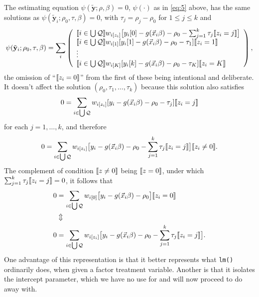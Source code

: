 \documentclass{article}
\DeclarePairedDelimiter{\indicator}{\llbracket}{\rrbracket}
\newcommand{\owt}[1][z_i]{\ensuremath{w_{i[#1]}}}
\begin{document}
The estimating equation $\psi(\tilde{\mathbf{y}}; \rho, \beta)=0$,
$\psi(\cdot)$ as in \eqref{eq:5} above, has the same solutions as $\psi(\tilde{\mathbf{y}}_{i};
  \rho_{0}, \tau, \beta)=0$, with $\tau_{j}=\rho_{j}-\rho_{0}$ for
$1\leq j \leq k$ and
\begin{equation*}
         \psi(\tilde{\mathbf{y}}_{i};
  \rho_{0}, \tau, \beta) =
         \sum_{i}\left( \begin{array}{l}
           \indicator{i \in \bigcup \mathcal{Q}}\owt{}\big[y_{i}[0] - g(\vec{x}_{i}\beta)-
                  \rho_{0} - \sum_{j=1}^{k}\tau_{j}\indicator{z_{i}=j}\big]\\
           \indicator{i \in \bigcup \mathcal{Q}}\owt[1][y_{i}[1] - g(\vec{x}_{i}\beta)-
                  \rho_{0}-\tau_{1}]\indicator{z_{i}=1}\\
                  \vdots \\
           \indicator{i \in \bigcup \mathcal{Q}}\owt[K][y_{i}[k] - g(\vec{x}_{i}\beta)-
                 \rho_{0} - \tau_{K}]\indicator{z_{i}=K}\\                  
                \end{array}\right), 
\end{equation*}
the omission of ``$\indicator{z_{i}=0}$'' from the first of these
being intentional and deliberate. It doesn't affect the solution
$(\rho_{0}, \tau_{1}, \ldots, \tau_{k})$
because this solution also satisfies
\begin{equation*}
       0 = \sum_{i \in \bigcup \mathcal{Q}}\owt{}[y_{i} - g(\vec{x}_{i}\beta)-
                  \rho_{0}-\tau_{j}]\indicator{z_{i}=j}
\end{equation*}
for each $j=1, \ldots, k$, and therefore
\begin{equation*}
       0 = \sum_{i \in \bigcup \mathcal{Q}}\owt{}\big[y_{i} - g(\vec{x}_{i}\beta)-
                  \rho_{0}-\sum_{j=1}^{k}\tau_{j}\indicator{z_{i}=j}\big]\indicator{z_{i}
                  \neq 0}.
\end{equation*}
The complement of condition $\indicator{z\neq 0}$ being
$\indicator{z=0}$, under which $\sum_{j=1}^{k}\tau_{j}\indicator{z_{i}=j}=0$, it follows that
\begin{align*}
         0 &= \sum_{i \in \bigcup \mathcal{Q}}\owt[0]\big[y_{i} - g(\vec{x}_{i}\beta)-
                  \rho_{0}\big]\indicator{z_{i}
             =0}\\
           & \Updownarrow \\
         0 &= \sum_{i \in \bigcup \mathcal{Q}}\owt{}\big[y_{i} - g(\vec{x}_{i}\beta)-
                  \rho_{0} - \sum_{j=1}^{k}\tau_{j}\indicator{z_{i}=j}\big].
\end{align*}
One advantage of this representation is that it better represents what
\texttt{lm()} ordinarily does, when given a factor treatment
variable.  Another is that it isolates the intercept parameter, which
we have no use for and will now proceed to do away with. 
\end{document}
